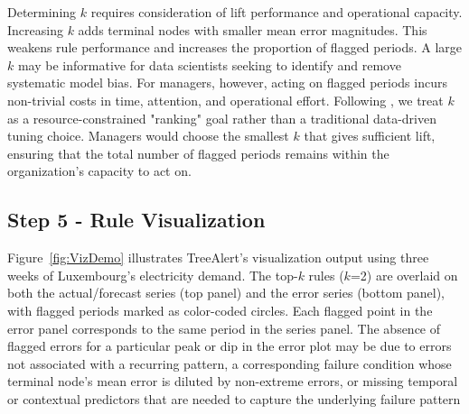 \documentclass[12pt]{article}
\begin{document}
Determining $k$ requires consideration of lift performance and operational capacity. Increasing $k$ adds %
terminal nodes with %
smaller mean error magnitudes. This weakens rule performance and increases the proportion of flagged periods. A large $k$ may be informative for data scientists seeking to identify and remove systematic model bias. For managers, however, acting on flagged periods incurs non-trivial costs in time, attention, and operational effort. Following \citet{shmueli2023machineR}, we treat $k$ as a resource-constrained "ranking" goal rather than a traditional data-driven tuning choice. %
Managers would choose the smallest $k$ that gives sufficient lift, ensuring that the total number of flagged periods remains within the organization's capacity to act on.


\subsection{Step 5 - Rule Visualization}
\label{subsec-step5}

Figure~\ref{fig:VizDemo} illustrates TreeAlert's visualization output using three weeks of Luxembourg's electricity demand. The top-$k$ rules ($k$=2) are overlaid on both the actual/forecast series (top panel) and the error series (bottom panel), with flagged periods marked as color-coded circles. Each flagged point in the error panel corresponds to the same period in the series panel. The absence of flagged errors for a particular peak or dip in the error plot may be due to errors not associated with a recurring pattern, a corresponding failure condition whose terminal node's mean error is diluted by non-extreme errors, or missing temporal or contextual predictors that are needed to capture the underlying failure pattern
\end{document}
